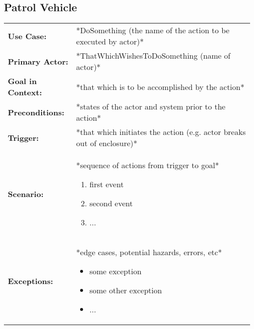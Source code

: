 \documentclass[12pt]{article}
\begin{document}
    
    
    \subsection{Patrol Vehicle}
    \begin{table}[H]
    \begin{tabular}{lp{9.9cm}}
        \hline
        \textbf{Use Case:}                     & *DoSomething (the name of the action to be executed by actor)* \\

        \textbf{Primary Actor:}                & *ThatWhichWishesToDoSomething (name of actor)*\\

        \textbf{Goal in Context:}              & *that which is to be accomplished by the action* \\

        \textbf{Preconditions:}                & *states of the actor and system prior to the action* \\

        \textbf{Trigger:}                      & *that which initiates the action (e.g. actor breaks out of enclosure)*\\

        \textbf{Scenario:}                     & *sequence of actions from trigger to goal*
                                                 \begin{enumerate}
                                                     \item first event
                                                     \item second event
                                                     \item ...
                                                 \end{enumerate} \\

        \textbf{Exceptions:}                   & *edge cases, potential hazards, errors, etc*
                                                 \begin{itemize}
                                                     \item[] some exception
                                                     \item[] some other exception
                                                     \item[] ...
                                                 \end{itemize}\\


\end{tabular}
\end{table}
\end{document}
